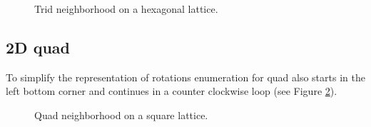 \documentclass{ijuc}
\begin{document}
\begin{figure}
\begin{center}
\end{center}
\caption{Trid neighborhood on a hexagonal lattice.}
\label{fig-trid}
\end{figure}

\subsection{2D quad}

To simplify the representation of rotations enumeration for quad also starts
in the left bottom corner and continues in a counter clockwise loop (see Figure \ref{fig-quad}).

\begin{figure}
\begin{center}
\end{center}
\caption{Quad neighborhood on a square lattice.}
\label{fig-quad}
\end{figure}
\end{document}
